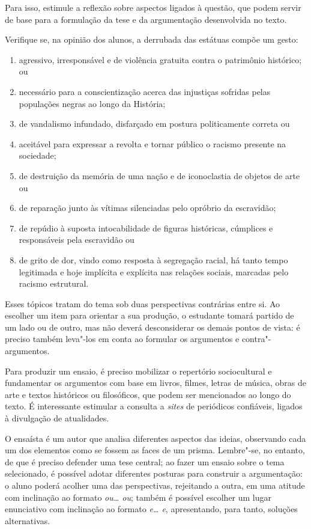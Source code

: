 \documentclass[11pt]{extarticle}
\begin{document}
Para isso, estimule a reflexão sobre aspectos
ligados à questão, que podem servir de base para a formulação da tese
e da argumentação desenvolvida no texto.

Verifique se, na opinião dos alunos, a derrubada das estátuas compõe um
gesto: 

\begin{enumerate}
\item agressivo, irresponsável e de violência gratuita contra o
patrimônio histórico; ou 
\item necessário para a conscientização acerca
das injustiças sofridas pelas populações negras ao longo da História;
\item de vandalismo infundado, disfarçado em postura politicamente correta
ou 
\item aceitável para expressar a revolta e tornar público o racismo
presente na sociedade; 
\item de destruição da memória de uma nação e de
iconoclastia de objetos de arte ou 
\item de reparação junto às vítimas
silenciadas pelo opróbrio da escravidão; 
\item de repúdio à suposta
intocabilidade de figuras históricas, cúmplices e responsáveis pela
escravidão ou 
\item de grito de dor, vindo como resposta à segregação
racial, há tanto tempo legitimada e hoje implícita e explícita nas
relações sociais, marcadas pelo racismo estrutural.
\end{enumerate}

Esses tópicos tratam do tema sob duas perspectivas contrárias entre si.
Ao escolher um item para orientar a sua produção, o estudante tomará
partido de um lado ou de outro, mas não deverá desconsiderar os demais
pontos de vista: é preciso também leva"-los em conta ao formular os
argumentos e contra"-argumentos.

Para produzir um ensaio, é preciso mobilizar o repertório sociocultural
e fundamentar os argumentos com base em livros, filmes, letras de
música, obras de arte e textos históricos ou filosóficos, que podem ser
mencionados ao longo do texto. É interessante estimular a consulta a
\emph{sites} de periódicos confiáveis, ligados à divulgação de
atualidades.

O ensaísta é um autor que analisa diferentes aspectos das ideias,
observando cada um dos elementos como se fossem as faces de um prisma.
Lembre"-se, no entanto, de que é preciso defender uma tese central; ao
fazer um ensaio sobre o tema selecionado, é possível adotar diferentes
posturas para construir a argumentação: o aluno poderá acolher uma das
perspectivas, rejeitando a outra, em uma atitude com inclinação ao
formato \emph{ou\ldots{} ou}; também é possível escolher um lugar enunciativo
com inclinação ao formato \emph{e\ldots{} e}, apresentando, para tanto,
soluções alternativas.
\end{document}

